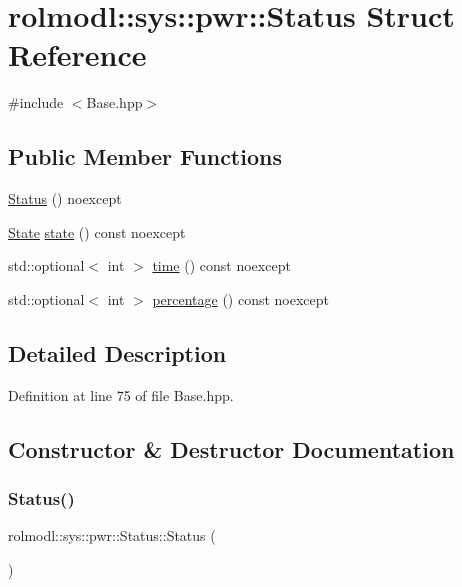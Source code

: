 \hypertarget{structrolmodl_1_1sys_1_1pwr_1_1_status}{}\section{rolmodl\+::sys\+::pwr\+::Status Struct Reference}
\label{structrolmodl_1_1sys_1_1pwr_1_1_status}


{\ttfamily \#include $<$Base.\+hpp$>$}

\subsection*{Public Member Functions}
\begin{DoxyCompactItemize}
\item 
\mbox{\hyperlink{structrolmodl_1_1sys_1_1pwr_1_1_status_adf2d0b8dc14e2b4ca8769384e6441b56}{Status}} () noexcept
\item 
\mbox{\hyperlink{namespacerolmodl_1_1sys_1_1pwr_ae84fe28ac28fdac077ff5363a4fc0dfb}{State}} \mbox{\hyperlink{structrolmodl_1_1sys_1_1pwr_1_1_status_a5ff0627375a1689b2860572f677f3ab5}{state}} () const noexcept
\item 
std\+::optional$<$ int $>$ \mbox{\hyperlink{structrolmodl_1_1sys_1_1pwr_1_1_status_a2a4c2a84875f92838e3270cf93c20f53}{time}} () const noexcept
\item 
std\+::optional$<$ int $>$ \mbox{\hyperlink{structrolmodl_1_1sys_1_1pwr_1_1_status_a6601c271fdacfbc8aab1ae99a1e523d9}{percentage}} () const noexcept
\end{DoxyCompactItemize}


\subsection{Detailed Description}


Definition at line 75 of file Base.\+hpp.



\subsection{Constructor \& Destructor Documentation}
\mbox{\label{structrolmodl_1_1sys_1_1pwr_1_1_status_adf2d0b8dc14e2b4ca8769384e6441b56}} 
\subsubsection{\texorpdfstring{Status()}{Status()}}
{\footnotesize\ttfamily rolmodl\+::sys\+::pwr\+::\+Status\+::\+Status (\begin{DoxyParamCaption}{ }\end{DoxyParamCaption})\hspace{0.3cm}{\ttfamily [noexcept]}}



